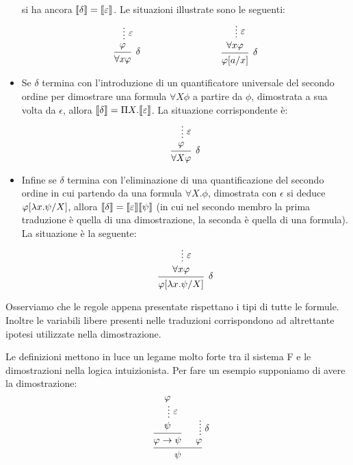\documentclass[]{marticle}
\begin{document}
\begin{itemize}
        si ha ancora $\llbracket \delta \rrbracket=\llbracket \varepsilon \rrbracket$.
        Le situazioni illustrate sono le seguenti:
        \[
            \begin{prooftree}
                \hypo{}
                \ellipsis{$\epsilon$}{\phi}
                \infer1[$\delta$]{\forall x \phi}
            \end{prooftree}
            \hspace{3cm}
            \begin{prooftree}
                \hypo{}
                \ellipsis{$\epsilon$}{\forall x \phi}
                \infer1[$\delta$]{\phi\sub{a}{x}}
            \end{prooftree}
        \]
    \item Se $\delta$ termina con l'introduzione di un quantificatore universale
        del secondo ordine per dimostrare una formula $\forall X\phi$ a partire
        da  $\phi$, dimostrata a sua volta da $\epsilon$, allora $\llbracket \delta \rrbracket =
        \Pi X. \llbracket \varepsilon \rrbracket$. La situazione corrispondente \`e:
        \[
            \begin{prooftree}
                \hypo{}
                \ellipsis{$\epsilon$}{\phi}
                \infer1[$\delta$]{\forall X \phi}
            \end{prooftree}
        \]
    \item Infine se $\delta$ termina con l'eliminazione di una quantificazione
        del secondo ordine in cui partendo da una formula $\forall X.\phi$,
        dimostrata con $\epsilon$ si deduce $\varphi[\lambda x. \psi/X]$, allora
        $\llbracket \delta \rrbracket = \llbracket \varepsilon \rrbracket\llbracket \psi \rrbracket$ (in cui nel secondo membro la
        prima traduzione \`e quella di una dimostrazione, la seconda \`e quella
        di una formula). La situazione \`e la seguente:
        \[
            \begin{prooftree}
                \hypo{}
                \ellipsis{$\epsilon$}{\forall x \phi}
                \infer1[$\delta$]{\phi\sub{\l x.\psi}{X}}
            \end{prooftree}
        \]
\end{itemize}

Osserviamo che le regole appena presentate rispettano i tipi di tutte le
formule. Inoltre le variabili libere presenti nelle traduzioni corrispondono ad
altrettante ipotesi utilizzate nella dimostrazione.

Le definizioni mettono in luce un legame molto forte tra il sistema F e le
dimostrazioni nella logica intuizionista. Per fare un esempio supponiamo di
avere la dimostrazione:
\[
    \begin{prooftree}
        \hypo{\phi}
        \ellipsis{$\epsilon$}{\psi}
        \infer1{\phi\rar\psi}
        \hypo{}
        \ellipsis{$\delta$}{\phi}
        \infer2{\psi}
    \end{prooftree}
\]
\end{document}
